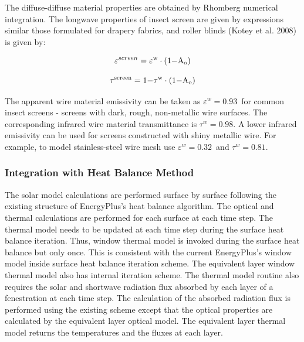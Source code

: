 {The diffuse-diffuse material properties are obtained by Rhomberg numerical integration. The longwave properties of insect screen are given by expressions similar those formulated for drapery fabrics, and roller blinds (Kotey et al. 2008) is given by:

\begin{equation}
{\varepsilon ^{screen}} = {\varepsilon ^{\rm{w}}} \cdot \left( {{\rm{1  -  }}{{\rm{A}}_{\rm{o}}}} \right)
\end{equation}

\begin{equation}
{\tau ^{{\rm{screen}}}} = {\rm{1 - }}{\tau ^{\rm{w}}} \cdot \left( {{\rm{1  -  }}{{\rm{A}}_{\rm{o}}}} \right)
\end{equation}

The apparent wire material emissivity can be taken as $\varepsilon^w = 0.93$\ for common insect screens - screens with dark, rough, non-metallic wire surfaces. The corresponding infrared wire material transmittance is $\tau^w = 0.98$. A lower infrared emissivity can be used for screens constructed with shiny metallic wire. For example, to model stainless-steel wire mesh use $\varepsilon^w = 0.32$\ and $\tau^w = 0.81$.

\subsubsection{Integration with Heat Balance Method}\label{integration-with-heat-balance-method}

The solar model calculations are performed surface by surface following the existing structure of EnergyPlus's heat balance algorithm. The optical and thermal calculations are performed for each surface at each time step. The thermal model needs to be updated at each time step during the surface heat balance iteration. Thus, window thermal model is invoked during the surface heat balance but only once. This is consistent with the current EnergyPlus's window model inside surface heat balance iteration scheme. The equivalent layer window thermal model also has internal iteration scheme. The thermal model routine also requires the solar and shortwave radiation flux absorbed by each layer of a fenestration at each time step. The calculation of the absorbed radiation flux is performed using the existing scheme except that the optical properties are calculated by the equivalent layer optical model. The equivalent layer thermal model returns the temperatures and the fluxes at each layer.

}
